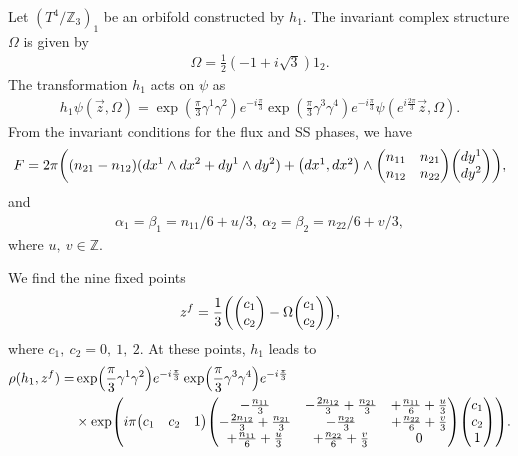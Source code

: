 \documentclass[11pt]{article}
\begin{document}
Let $(T^4/ \mathbb{Z}_3)_1$ be an orbifold constructed by $h_1$. The invariant complex structure $\Omega$ is given by
\begin{align}
    \Omega= \frac{1}{2}(-1+ i \sqrt{3})1_2.
\end{align}
The transformation $h_1$ acts on $\psi$ as
\begin{align}
    h_1 \psi(\vec{z},\Omega)= \exp(\frac{\pi}{3} \gamma^1 \gamma^2)e^{-i\frac{\pi}{3}} \exp(\frac{\pi}{3} \gamma^3 \gamma^4)e^{-i\frac{\pi}{3}} \psi( e^{i \frac{2\pi}{3} }\vec{z},\Omega).
\end{align}
From the invariant conditions for the flux and SS phases, we have
\begin{align}
    F= 2\pi \qty( (n_{21}- n_{12})(dx^1 \wedge dx^2 +dy^1 \wedge dy^2  ) + \mqty(dx^1 ,dx^2) \wedge \mqty(n_{11} & n_{21} \\ n_{12}  & n_{22})  \mqty(dy^1 \\ dy^2 )),
\end{align}
and 
\begin{align}
    \alpha_1= \beta_1= n_{11}/6 +u/3 ,~\alpha_2= \beta_2= n_{22}/6 +v/3, 
\end{align}
where $u,~ v \in \mathbb{Z}$.


We find the nine fixed points 
\begin{align}
    z^f= \frac{1}{3} \qty( \mqty(c_1 \\c_2) -\Omega \mqty(c_1 \\c_2) ),
\end{align}
where $c_1,~c_2=0,~1,~2$. At these points, $h_1$ leads to
\begin{align}
    \rho(h_1, z^f)=& \exp(\frac{\pi}{3} \gamma^1 \gamma^2)e^{-i\frac{\pi}{3}} \exp(\frac{\pi}{3} \gamma^3 \gamma^4)e^{-i\frac{\pi}{3}} \nonumber \\
    &\times \exp(i\pi \mqty( c_1& c_2& 1) \mqty( -\frac{n_{11}}{3} & - \frac{2 n_{12}}{3} + \frac{ n_{21}}{3} & + \frac{n_{11}}{6} +\frac{u}{3} \\
    - \frac{2 n_{12}}{3} + \frac{ n_{21}}{3} & -\frac{n_{22}}{3} &  + \frac{n_{22}}{6} + \frac{v}{3} \\
     + \frac{n_{11}}{6} + \frac{u}{3} &  +\frac{n_{22}}{6} + \frac{v}{3} & 0 ) \mqty(c_1 \\ c_2 \\1 )).
\end{align}
\end{document}

